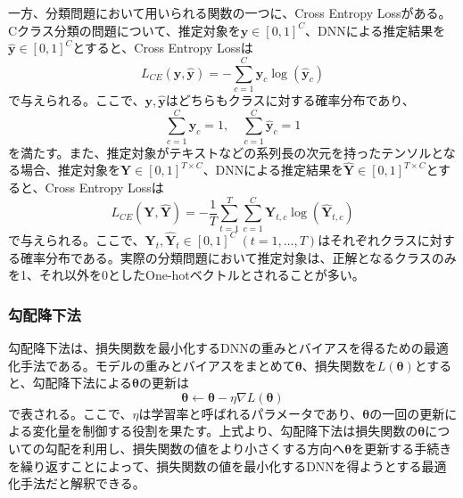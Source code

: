 \documentclass[12pt]{jarticle}
\numberwithin{equation}{section}    %
\numberwithin{figure}{section}      %
\numberwithin{table}{section}      %
\begin{document}
一方、分類問題において用いられる関数の一つに、Cross Entropy Lossがある。Cクラス分類の問題について、推定対象を$\bm{y} \in [0, 1]^{C}$、DNNによる推定結果を$\hat{\bm{y}} \in [0, 1]^{C}$とすると、Cross Entropy Lossは
\begin{equation}
    L_{CE}(\bm{y}, \hat{\bm{y}}) = - \sum_{c = 1}^{C} \bm{y}_{c}\log(\hat{\bm{y}}_{c})
\end{equation}
で与えられる。ここで、$\bm{y}, \hat{\bm{y}}$はどちらもクラスに対する確率分布であり、
\begin{equation}
    \sum_{c = 1}^{C} \bm{y}_{c} = 1, \quad \sum_{c = 1}^{C} \hat{\bm{y}}_{c} = 1
\end{equation}
を満たす。また、推定対象がテキストなどの系列長の次元を持ったテンソルとなる場合、推定対象を$\bm{Y} \in [0, 1]^{T \times C}$、DNNによる推定結果を$\hat{\bm{Y}} \in [0, 1]^{T \times C}$とすると、Cross Entropy Lossは
\begin{equation}
    L_{CE}(\bm{Y}, \hat{\bm{Y}}) = - \frac{1}{T} \sum_{t = 1}^{T} \sum_{c = 1}^{C} \bm{Y}_{t, c}\log(\hat{\bm{Y}}_{t, c})
\end{equation}
で与えられる。ここで、$\bm{Y}_{t}, \hat{\bm{Y}}_{t} \in [0, 1]^{C} ~ (t = 1, \ldots, T)$はそれぞれクラスに対する確率分布である。実際の分類問題において推定対象は、正解となるクラスのみを1、それ以外を0としたOne-hotベクトルとされることが多い。

\subsubsection{勾配降下法}
\label{sec3:sec:gradient_descent}
勾配降下法は、損失関数を最小化するDNNの重みとバイアスを得るための最適化手法である。モデルの重みとバイアスをまとめて$\bm{\theta}$、損失関数を$L(\bm{\theta})$とすると、勾配降下法による$\bm{\theta}$の更新は
\begin{equation}
    \bm{\theta} \leftarrow \bm{\theta} - \eta \nabla L(\bm{\theta})
\end{equation}
で表される。ここで、$\eta$は学習率と呼ばれるパラメータであり、$\bm{\theta}$の一回の更新による変化量を制御する役割を果たす。上式より、勾配降下法は損失関数の$\bm{\theta}$についての勾配を利用し、損失関数の値をより小さくする方向へ$\bm{\theta}$を更新する手続きを繰り返すことによって、損失関数の値を最小化するDNNを得ようとする最適化手法だと解釈できる。
\end{document}
